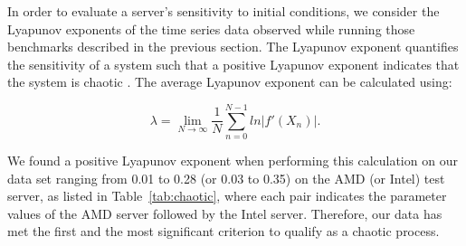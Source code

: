 \documentclass[times,10pt,finalversion]{usetex-v1}
\begin{document}
In order to evaluate a server's sensitivity to initial conditions, we
consider the Lyapunov exponents of the time series data
observed while running those benchmarks described in the previous section.
The Lyapunov exponent quantifies the sensitivity of a system such that a
positive Lyapunov exponent indicates that the system is chaotic
\cite{Sprott2003}.  The average Lyapunov exponent can be calculated
using:
{\setlength{\abovedisplayskip}{0pt plus 0pt minus 0pt}
 \setlength{\belowdisplayskip}{0pt plus 0pt minus 0pt}
\begin{small}
  \begin{equation}
    \label{avgLypEq}
    \lambda =
    \lim_{N\to\infty}\frac{1}{N}\sum_{n=0}^{N-1}ln|f'(X_n)|.\nonumber
  \end{equation}
\end{small}
} We found a positive Lyapunov exponent when performing this calculation
on our data set ranging from 0.01 to 0.28 (or 0.03 to 0.35) on the AMD
(or Intel) test server, as listed in Table~\ref{tab:chaotic},
where each pair indicates the parameter values of the AMD server followed by the Intel server.
Therefore, our data has met the first and the most significant criterion
to qualify as a chaotic process.
\end{document}
